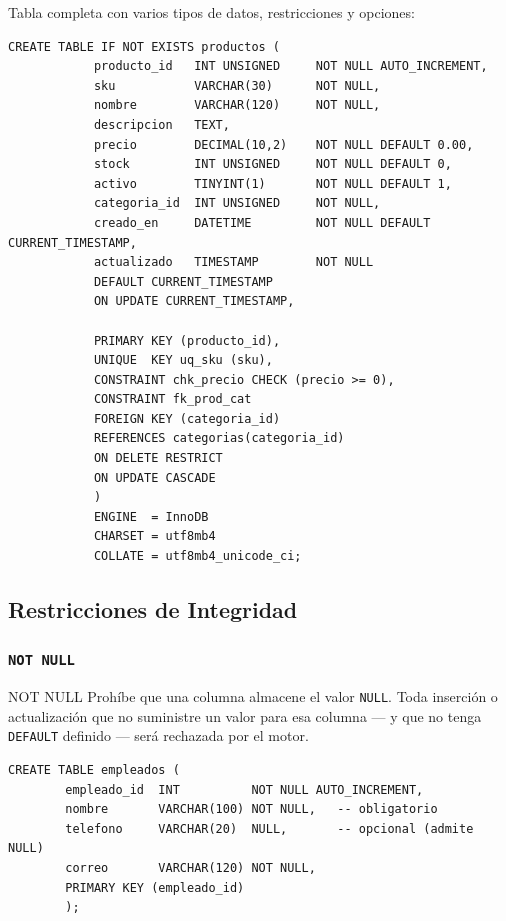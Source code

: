 \documentclass[12pt, a4paper]{article}
\begin{document}
	\begin{ejemplo}
		Tabla completa con varios tipos de datos, restricciones y opciones:
		
		\begin{lstlisting}[style=sql, caption={CREATE TABLE con opciones reales de producción}]
			CREATE TABLE IF NOT EXISTS productos (
			producto_id   INT UNSIGNED     NOT NULL AUTO_INCREMENT,
			sku           VARCHAR(30)      NOT NULL,
			nombre        VARCHAR(120)     NOT NULL,
			descripcion   TEXT,
			precio        DECIMAL(10,2)    NOT NULL DEFAULT 0.00,
			stock         INT UNSIGNED     NOT NULL DEFAULT 0,
			activo        TINYINT(1)       NOT NULL DEFAULT 1,
			categoria_id  INT UNSIGNED     NOT NULL,
			creado_en     DATETIME         NOT NULL DEFAULT CURRENT_TIMESTAMP,
			actualizado   TIMESTAMP        NOT NULL
			DEFAULT CURRENT_TIMESTAMP
			ON UPDATE CURRENT_TIMESTAMP,
			
			PRIMARY KEY (producto_id),
			UNIQUE  KEY uq_sku (sku),
			CONSTRAINT chk_precio CHECK (precio >= 0),
			CONSTRAINT fk_prod_cat
			FOREIGN KEY (categoria_id)
			REFERENCES categorias(categoria_id)
			ON DELETE RESTRICT
			ON UPDATE CASCADE
			)
			ENGINE  = InnoDB
			CHARSET = utf8mb4
			COLLATE = utf8mb4_unicode_ci;
		\end{lstlisting}
	\end{ejemplo}
	
	\subsection{Restricciones de Integridad}
	
	\subsubsection{\texttt{NOT NULL}}
	
	\begin{definicion}{NOT NULL}
		Prohíbe que una columna almacene el valor \texttt{NULL}. Toda inserción o
		actualización que no suministre un valor para esa columna — y que no tenga
		\texttt{DEFAULT} definido — será rechazada por el motor.
	\end{definicion}
	
	\begin{lstlisting}[style=sql, caption={Columnas con y sin NOT NULL}]
		CREATE TABLE empleados (
		empleado_id  INT          NOT NULL AUTO_INCREMENT,
		nombre       VARCHAR(100) NOT NULL,   -- obligatorio
		telefono     VARCHAR(20)  NULL,       -- opcional (admite NULL)
		correo       VARCHAR(120) NOT NULL,
		PRIMARY KEY (empleado_id)
		);
	\end{lstlisting}
	
\end{document}
